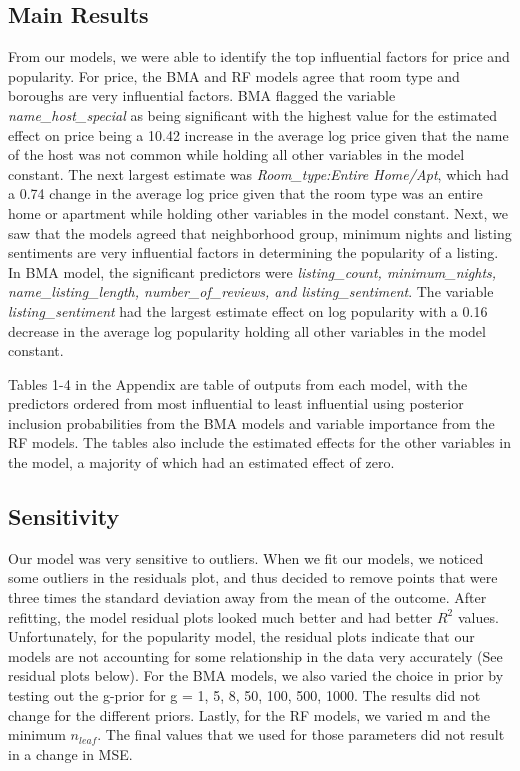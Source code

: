 \documentclass{article}
\begin{document}
\subsection{Main Results} 

From our models, we were able to identify the top influential factors for price and popularity. For price, the BMA and RF models agree that room type and boroughs are very influential factors. BMA flagged the variable \textit{name_host_special} as being significant with the highest value for the estimated effect on price being a 10.42 increase in the average log price given that the name of the host was not common while holding all other variables in the model constant. The next largest estimate was \textit{Room_type:Entire Home/Apt}, which had a 0.74 change in the average log price given that the room type was an entire home or apartment while holding other variables in the model constant. Next, we saw that the models agreed that neighborhood group, minimum nights and listing sentiments are very influential factors in determining the popularity of a listing. In BMA model, the significant predictors were \textit{listing_count, minimum_nights, name_listing_length, number_of_reviews, and listing_sentiment}. The variable \textit{listing_sentiment} had the largest estimate effect on log popularity with a 0.16 decrease in the average log popularity holding all other variables in the model constant. 

Tables 1-4 in the Appendix are table of outputs from each model, with the predictors ordered from most influential to least influential using posterior inclusion probabilities from the BMA models and variable importance from the RF models. The tables also include the estimated effects for the other variables in the model, a majority of which had an estimated effect of zero. 


\subsection{Sensitivity} 
Our model was very sensitive to outliers. When we fit our models, we noticed some outliers in the residuals plot, and thus decided to remove points that were three times the standard deviation away from the mean of the outcome. After refitting, the model residual plots looked much better and had better $R^2$ values. Unfortunately, for the popularity model, the residual plots indicate that our models are not accounting for some relationship in the data very accurately (See residual plots below). For the BMA models, we also varied the choice in prior by testing out the g-prior for g = 1, 5, 8, 50, 100, 500, 1000. The results did not change for the different priors. Lastly, for the RF models, we varied m and the minimum $n_{leaf}$. The final values that we used for those parameters did not result in a change in MSE. 
\end{document}
